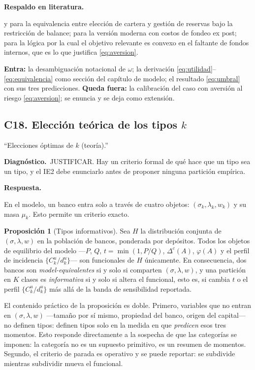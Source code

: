 \documentclass[11pt]{article}
\newcommand{\diag}[1]{\par\noindent\textbf{Diagn\'ostico.}\ #1\par}
\newcommand{\resp}{\par\noindent\textbf{Respuesta.}\par}
\newcommand{\lit}{\par\noindent\textbf{Respaldo en literatura.}\par}
\theoremstyle{definition}
\newtheorem{prop}{Proposici\'on}
\begin{document}
\lit
\citet{baltensperger1980} y \citet{poole1968} para la equivalencia entre elecci\'on
de cartera y gesti\'on de reservas bajo la restricci\'on de balance;
\citet{bianchibigio2022} para la versi\'on moderna con costos de fondeo ex post;
\citet{froot1993} para la l\'ogica por la cual el objetivo relevante es convexo en
el faltante de fondos internos, que es lo que justifica \eqref{eq:aversion}.

\begin{ie2}
\textbf{Entra:} la desambiguaci\'on notacional de $\omega$; la derivaci\'on
\eqref{eq:utilidad}--\eqref{eq:equivalencia} como secci\'on del cap\'itulo de
modelo; el resultado \eqref{eq:umbral} con sus tres predicciones.
\textbf{Queda fuera:} la calibraci\'on del caso con aversi\'on al riesgo
\eqref{eq:aversion}; se enuncia y se deja como extensi\'on.
\end{ie2}

\subsection{C18. Elecci\'on te\'orica de los tipos $k$}\label{sub:C18}

\begin{jurado}
``Elecciones \'optimas de $k$ (teor\'ia).''
\end{jurado}

\diag{JUSTIFICAR. Hay un criterio formal de qu\'e hace que un tipo sea un tipo, y
el IE2 debe enunciarlo antes de proponer ninguna partici\'on emp\'irica.}

\resp
En el modelo, un banco entra solo a trav\'es de cuatro objetos:
$(\sigma_k,\lambda_k,w_k)$ y su masa $\mu_k$. Esto permite un criterio exacto.

\begin{prop}[Tipos informativos]
Sea $H$ la distribuci\'on conjunta de $(\sigma,\lambda,w)$ en la poblaci\'on de
bancos, ponderada por dep\'ositos. Todos los objetos de equilibrio del modelo
---$P$, $Q$, $t=\min(1,P/Q)$, $\Delta^c(A)$, $\varphi(A)$ y el perfil de
incidencia $\{C^u_k/d^u_k\}$--- son funcionales de $H$ \'unicamente. En
consecuencia, dos bancos son \emph{model-equivalentes} si y solo si comparten
$(\sigma,\lambda,w)$, y una partici\'on en $K$ clases es \emph{informativa} si y
solo si altera el funcional, esto es, si cambia $t$ o el perfil
$\{C^u_k/d^u_k\}$ m\'as all\'a de la banda de sensibilidad reportada.
\end{prop}

\noindent El contenido pr\'actico de la proposici\'on es doble. Primero, variables
que no entran en $(\sigma,\lambda,w)$ ---tama\~no por s\'i mismo, propiedad del
banco, origen del capital--- no definen tipos: definen tipos solo en la medida
en que \emph{predicen} esos tres momentos. Esto responde directamente a la
sospecha de que las categor\'ias se imponen: la categor\'ia no es un supuesto
primitivo, es un resumen de momentos. Segundo, el criterio de parada es
operativo y se puede reportar: se subdivide mientras subdividir mueva el
funcional.
\end{document}
